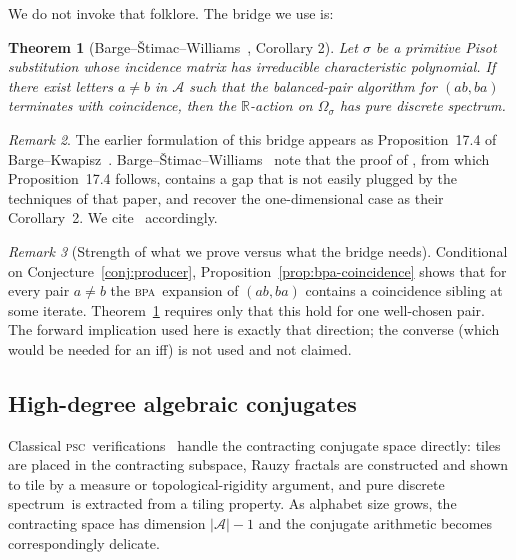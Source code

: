\documentclass[11pt]{article}
\theoremstyle{plain}
\newtheorem{theorem}{Theorem}[section]
\theoremstyle{definition}
\theoremstyle{remark}
\newtheorem{remark}[theorem]{Remark}
\newcommand{\PSC}{\textsc{psc}}
\newcommand{\BPA}{\textsc{bpa}}
\newcommand{\PDS}{pure discrete spectrum}
\newcommand{\R}{\mathbb{R}}
\newcommand{\A}{\mathcal{A}}
\begin{document}
We do not invoke that folklore. The bridge we use is:

\begin{theorem}[Barge--\v{S}timac--Williams~\cite{BSW}, Corollary 2]\label{thm:BSW}
Let $\sigma$ be a primitive Pisot substitution whose incidence matrix has irreducible characteristic polynomial. If there exist letters $a\ne b$ in $\A$ such that the balanced-pair algorithm for $(ab,ba)$ terminates with coincidence, then the $\R$-action on $\Omega_\sigma$ has \PDS.
\end{theorem}

\begin{remark}\label{rem:BK-gap}
The earlier formulation of this bridge appears as Proposition~17.4 of Barge--Kwapisz~\cite{BK}. Barge--\v{S}timac--Williams~\cite[\S 1]{BSW} note that the proof of \cite[Theorem 16.3]{BK}, from which Proposition~17.4 follows, contains a gap that is not easily plugged by the techniques of that paper, and recover the one-dimensional case as their Corollary~2. We cite~\cite{BSW} accordingly.
\end{remark}

\begin{remark}[Strength of what we prove versus what the bridge needs]\label{rem:overprove}
Conditional on Conjecture~\ref{conj:producer}, Proposition~\ref{prop:bpa-coincidence} shows that for every pair $a\ne b$ the \BPA\ expansion of $(ab,ba)$ contains a coincidence sibling at some iterate. Theorem~\ref{thm:BSW} requires only that this hold for one well-chosen pair. The forward implication used here is exactly that direction; the converse (which would be needed for an iff) is not used and not claimed.
\end{remark}

\subsection{High-degree algebraic conjugates}\label{sec:high-degree}

Classical \PSC\ verifications~\cite{HS,IR,BK,Barge2016,Barge2018} handle the contracting conjugate space directly: tiles are placed in the contracting subspace, Rauzy fractals are constructed and shown to tile by a measure or topological-rigidity argument, and \PDS\ is extracted from a tiling property. As alphabet size grows, the contracting space has dimension $|\A|-1$ and the conjugate arithmetic becomes correspondingly delicate.
\end{document}
